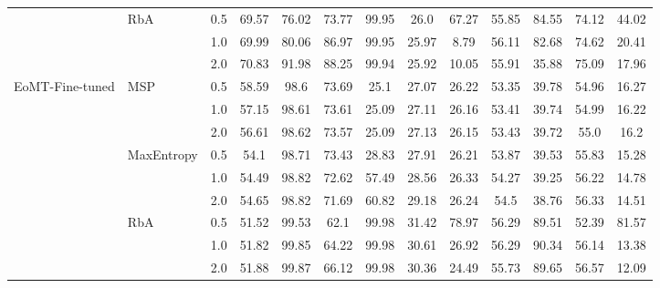 \begin{table}[!tp]
{\begin{tabular}{llc|cc|cc|cc|cc|cc}
 & RbA & 0.5 & 69.57 & 76.02 & 73.77 & 99.95 & 26.0 & 67.27 & 55.85 & 84.55 & 74.12 & 44.02 \\
 &  & 1.0 & 69.99 & 80.06 & 86.97 & 99.95 & 25.97 & 8.79 & 56.11 & 82.68 & 74.62 & 20.41 \\
 &  & 2.0 & 70.83 & 91.98 & 88.25 & 99.94 & 25.92 & 10.05 & 55.91 & 35.88 & 75.09 & 17.96 \\
\midrule
EoMT-Fine-tuned & MSP & 0.5 & 58.59 & 98.6 & 73.69 & 25.1 & 27.07 & 26.22 & 53.35 & 39.78 & 54.96 & 16.27 \\
 &  & 1.0 & 57.15 & 98.61 & 73.61 & 25.09 & 27.11 & 26.16 & 53.41 & 39.74 & 54.99 & 16.22 \\
 &  & 2.0 & 56.61 & 98.62 & 73.57 & 25.09 & 27.13 & 26.15 & 53.43 & 39.72 & 55.0 & 16.2 \\
 & MaxEntropy & 0.5 & 54.1 & 98.71 & 73.43 & 28.83 & 27.91 & 26.21 & 53.87 & 39.53 & 55.83 & 15.28 \\
 &  & 1.0 & 54.49 & 98.82 & 72.62 & 57.49 & 28.56 & 26.33 & 54.27 & 39.25 & 56.22 & 14.78 \\
 &  & 2.0 & 54.65 & 98.82 & 71.69 & 60.82 & 29.18 & 26.24 & 54.5 & 38.76 & 56.33 & 14.51 \\
 & RbA & 0.5 & 51.52 & 99.53 & 62.1 & 99.98 & 31.42 & 78.97 & 56.29 & 89.51 & 52.39 & 81.57 \\
 &  & 1.0 & 51.82 & 99.85 & 64.22 & 99.98 & 30.61 & 26.92 & 56.29 & 90.34 & 56.14 & 13.38 \\
 &  & 2.0 & 51.88 & 99.87 & 66.12 & 99.98 & 30.36 & 24.49 & 55.73 & 89.65 & 56.57 & 12.09 \\
\bottomrule
\end{tabular}}
\end{table}